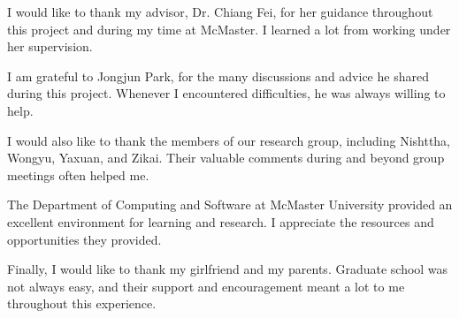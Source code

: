 
I would like to thank my advisor, Dr. Chiang Fei, for her guidance throughout this project and during my time at McMaster. I learned a lot from working under her supervision.

I am grateful to Jongjun Park, for the many discussions and advice he shared during this project. Whenever I encountered difficulties, he was always willing to help.

I would also like to thank the members of our research group, including Nishttha, Wongyu, Yaxuan, and Zikai. Their valuable comments during and beyond group meetings often helped me.

The Department of Computing and Software at McMaster University provided an excellent environment for learning and research. I appreciate the resources and opportunities they provided.

Finally, I would like to thank my girlfriend and my parents. Graduate school was not always easy, and their support and encouragement meant a lot to me throughout this experience.